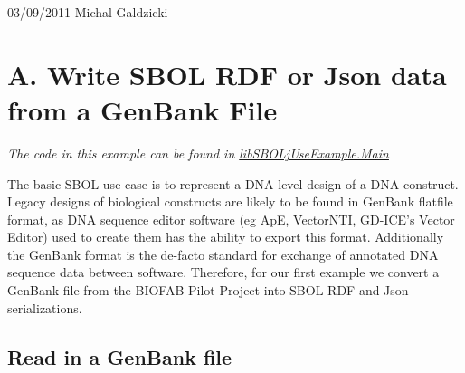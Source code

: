 \begin{center} 03/09/2011 Michal Galdzicki \end{center} \hypertarget{tutorial_A}{}\section{A. Write SBOL RDF or Json data from a GenBank File}\label{tutorial_A}
{\itshape The code in this example can be found in \hyperlink{classlib_s_b_o_lj_use_example_1_1_main}{libSBOLjUseExample.Main}\/}

The basic SBOL use case is to represent a DNA level design of a DNA construct. Legacy designs of biological constructs are likely to be found in GenBank flatfile format, as DNA sequence editor software (eg ApE, VectorNTI, GD-\/ICE's Vector Editor) used to create them has the ability to export this format. Additionally the GenBank format is the de-\/facto standard for exchange of annotated DNA sequence data between software. Therefore, for our first example we convert a GenBank file from the BIOFAB Pilot Project into SBOL RDF and Json serializations.\hypertarget{tutorial_gb_in}{}\subsection{Read in a GenBank file}\label{tutorial_gb_in}

